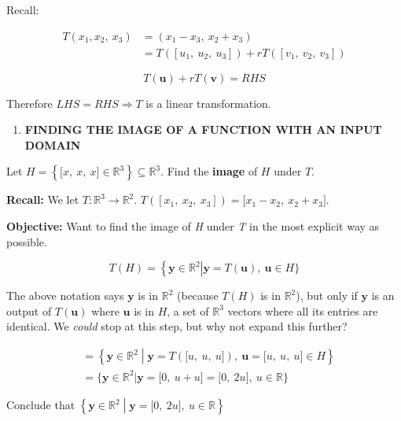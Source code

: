 \documentclass[
]{article}
\begin{document}
Recall:

\begin{align*}
T\left( x_{1},x_{2},\ x_{3} \right) &= \left( x_{1} - x_{3},\ x_{2} + x_{3} \right)
 \\
&= T\left( \left\lbrack u_{1},\ u_{2},\ u_{3} \right\rbrack \right) + rT\left( \left\lbrack v_{1},\ v_{2},\ v_{3} \right\rbrack \right)
\end{align*}


$$T\left( \mathbf{u} \right) + rT\left( \mathbf{v} \right) = RHS$$

Therefore $LHS = RHS \Rightarrow T$ is a linear transformation.

\begin{enumerate}
\def\labelenumi{\arabic{enumi}.}
\setcounter{enumi}{1}
\item
  \textbf{FINDING THE IMAGE OF A FUNCTION WITH AN INPUT DOMAIN}
\end{enumerate}

Let
$H = \left\{ \lbrack x,\ x,\ x\rbrack \in \mathbb{R}^{3} \right\} \subseteq \mathbb{R}^{3}$.
Find the \textbf{image} of $H$ under $T$.

\textbf{Recall:} We let $T:\mathbb{R}^{3} \rightarrow \mathbb{R}^{2}$.
$T\left( \left\lbrack x_{1},\ x_{2},\ x_{3} \right\rbrack \right) = \lbrack x_{1} - x_{2},\ x_{2} + x_{3}\rbrack$.

\textbf{Objective:} Want to find the image of \emph{H} under \emph{T} in
the most explicit way as possible.

$$T(H) = \left\{ \mathbf{y} \in \mathbb{R}^{2} \right|\mathbf{y} = T\left( \mathbf{u} \right),\ \mathbf{u} \in H\}$$

The above notation says $\mathbf{y}$ is in $\mathbb{R}^{2}$
(because $T(H)$ is in $\mathbb{R}^{2}$), but only if
$\mathbf{y}$ is an output of $T(\mathbf{u})$ where
$\mathbf{u}$ is in $H$, a set of $\mathbb{R}^{3}$ vectors
where all its entries are identical. We \emph{could} stop at this step,
but why not expand this further?

\begin{align*}
&= \left\{ \mathbf{y} \in \mathbb{R}^{2} \middle| \mathbf{y} = T\left( \lbrack u,\ u,\ u\rbrack \right),\ \mathbf{u} = \lbrack u,\ u,\ u\rbrack \in H \right\}
 \\
&= \{\mathbf{y} \in \mathbb{R}^{2}|\mathbf{y} = \lbrack 0,\ u + u\rbrack = \lbrack 0,\ 2u\rbrack,\ u\mathbb{\in R\}}
\end{align*}


Conclude that
$\left\{ \mathbf{y} \in \mathbb{R}^{2} \middle| \mathbf{y} = \lbrack 0,\ 2u\rbrack,\ u\mathbb{\in R} \right\}$
\end{document}
